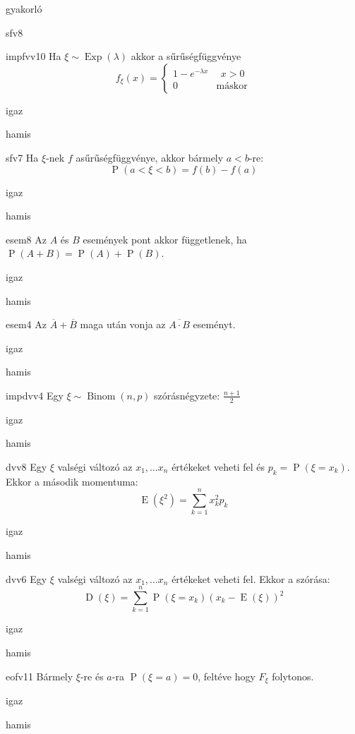 \documentclass[12pt]{article}
\DeclareMathOperator{\Exp}{Exp}
\DeclareMathOperator{\Binom}{Binom}
\DeclareMathOperator{\E}{E}
\DeclareMathOperator{\D}{D}
\renewcommand{\P}{\operatorname{P}}
\begin{document}
\begin{quiz}{gyakorló}
\begin{multi}{sfv8}
\end{multi}
\begin{multi}{impfvv10}
Ha $\xi\sim \Exp(\lambda)$ akkor a sűrűségfüggvénye 
$$
f_{\xi}(x)=
\begin{cases}
1-e^{-\lambda x}& \ \ x>0\\
0 & \text{máskor} 
\end{cases}
$$
\item igaz
\item* hamis
\end{multi}
\begin{multi}{sfv7}
Ha $\xi$-nek $f$ asűrűségfüggvénye, akkor bármely $a<b$-re:
$$
\P(a<\xi<b)=f(b)-f(a)
$$
\item igaz
\item* hamis
\end{multi}
\begin{multi}{esem8}
Az $A$ és $B$ események pont akkor függetlenek, ha $\P(A+B)=\P(A)+\P(B)$.
\item igaz
\item* hamis
\end{multi}
\begin{multi}{esem4}
Az $\overline{A} + \overline{B}$ maga után vonja az $\overline{A\cdot B}$ eseményt.
\item* igaz
\item hamis
\end{multi}
\begin{multi}{impdvv4}
Egy $\xi\sim \Binom(n,p)$ szórásnégyzete: $\frac{n+1}{2}$
\item igaz
\item* hamis
\end{multi}
\begin{multi}{dvv8}
Egy $\xi$ valségi változó az $x_1,\ldots x_n$ értékeket veheti fel és $p_k=\P(\xi=x_k)$. 
Ekkor a második momentuma:
$$
\E(\xi^2)=\sum_{k=1}^n x_k^2 p_k
$$
\item* igaz
\item hamis
\end{multi}
\begin{multi}{dvv6}
Egy $\xi$ valségi változó az $x_1,\ldots x_n$ értékeket veheti fel. Ekkor a szórása:
$$
\D(\xi)=\sum_{k=1}^n \P(\xi=x_k)(x_k-\E(\xi))^2
$$
\item igaz
\item* hamis
\end{multi}
\begin{multi}{eofv11}
Bármely $\xi$-re és $a$-ra $\P(\xi= a)=0$, feltéve hogy $F_{\xi}$ folytonos.
\item* igaz
\item hamis
\end{multi}
\end{quiz}
\end{document}
